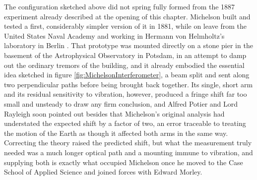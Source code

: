         The configuration sketched above did not spring fully formed from the 1887 experiment already described at the opening of this chapter. Michelson built and tested a first, considerably simpler version of it in 1881, while on leave from the United States Naval Academy and working in Hermann von Helmholtz's laboratory in Berlin \cite{michelson1881relative}. That prototype was mounted directly on a stone pier in the basement of the Astrophysical Observatory in Potsdam, in an attempt to damp out the ordinary tremors of the building, and it already embodied the essential idea sketched in figure \ref{fig:MichelsonInterferometer}, a beam split and sent along two perpendicular paths before being brought back together. Its single, short arm and its residual sensitivity to vibration, however, produced a fringe shift far too small and unsteady to draw any firm conclusion, and Alfred Potier and Lord Rayleigh soon pointed out besides that Michelson's original analysis had understated the expected shift by a factor of two, an error traceable to treating the motion of the Earth as though it affected both arms in the same way. Correcting the theory raised the predicted shift, but what the measurement truly needed was a much longer optical path and a mounting immune to vibration, and supplying both is exactly what occupied Michelson once he moved to the Case School of Applied Science and joined forces with Edward Morley.

